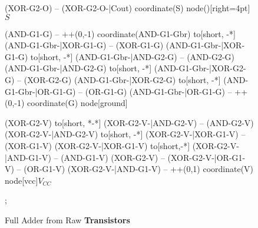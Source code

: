 \documentclass[a4paper, 10pt]{article}
\begin{document}
\begin{figure}[!h]
{\begin{circuitikz}[american, rotate=-90, transform shape]
		(XOR-G2-O) -- (XOR-G2-O-|Cout)
		coordinate(S)
		node()[right=4pt]{$S$}

		(AND-G1-G) -- ++(0,-1)
		coordinate(AND-G1-Gbr)
		to[short, -*] (AND-G1-Gbr-|XOR-G1-G)
		-- (XOR-G1-G)
		(AND-G1-Gbr-|XOR-G1-G)
		to[short, -*] (AND-G1-Gbr-|AND-G2-G)
		-- (AND-G2-G)
		(AND-G1-Gbr-|AND-G2-G)
		to[short, -*] (AND-G1-Gbr-|XOR-G2-G)
		-- (XOR-G2-G)
		(AND-G1-Gbr-|XOR-G2-G)
		to[short, -*] (AND-G1-Gbr-|OR-G1-G)
		-- (OR-G1-G)
		(AND-G1-Gbr-|OR-G1-G)
		-- ++(0,-1)
		coordinate(G)
		node[ground]{}

		(XOR-G2-V)
		to[short, *-*] (XOR-G2-V-|AND-G2-V)
		-- (AND-G2-V)
		(XOR-G2-V-|AND-G2-V)
		to[short, -*] (XOR-G2-V-|XOR-G1-V)
		-- (XOR-G1-V)
		(XOR-G2-V-|XOR-G1-V)
		to[short,-*] (XOR-G2-V-|AND-G1-V)
		-- (AND-G1-V)
		(XOR-G2-V)
		-- (XOR-G2-V-|OR-G1-V)
		-- (OR-G1-V)
		(XOR-G2-V-|AND-G1-V)
		-- ++(0,1)
		coordinate(V)
		node[vcc]{$V_{CC}$}

		;

	\end{circuitikz}
	}
	\caption{Full Adder from Raw \textbf{Transistors}}
\end{figure}
\end{document}
